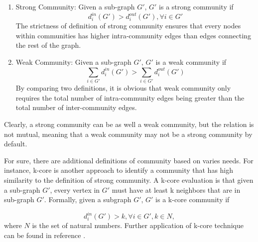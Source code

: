 \documentclass[12pt]{article}
\begin{document}
\begin{enumerate}[label=(\roman*)]
    \begin{enumerate}
        \item Strong Community: Given a sub-graph $G'$, $G'$ is a strong community if
        \begin{equation}\label{eq:strong_com}
        d_i^{in}(G') > d_i^{out}(G'), \forall i \in G'
        \end{equation}
        The strictness of definition of strong community ensures that every nodes within communities has higher intra-community edges than edges connecting the rest of the graph.
        \item Weak Community: Given a sub-graph $G'$, $G'$ is a weak community if
        \begin{equation}\label{eq:weak_com}
        \sum_{i \in G'}d_i^{in}(G') > \sum_{i \in G'}d_i^{out}(G')
        \end{equation}
        By comparing two definitions, it is obvious that weak community only requires the total number of intra-community edges being greater than the total number of inter-community edges.
    \end{enumerate}
    
    Clearly, a strong community can be as well a weak community, but the relation is not mutual, meaning that a weak community may not be a strong community by default. 
    
    For sure, there are additional definitions of community based on varies needs. For instance, k-core is another approach to identify a community that has high similarity to the definition of strong community. A k-core evaluation is that given a sub-graph $G'$, every vertex in $G'$ must have at least k neighbors that are in sub-graph $G'$. Formally, given a subgraph $G'$, $G'$ is a k-core community if 
    
    \begin{equation}\label{eq:k_core}
    d_i^{in}(G') > k, \forall i \in G', k \in N,
    \end{equation}
    where $N$ is the set of natural numbers. Further application of k-core technique can be found in reference \cite{20}.


\end{enumerate}
\end{document}
